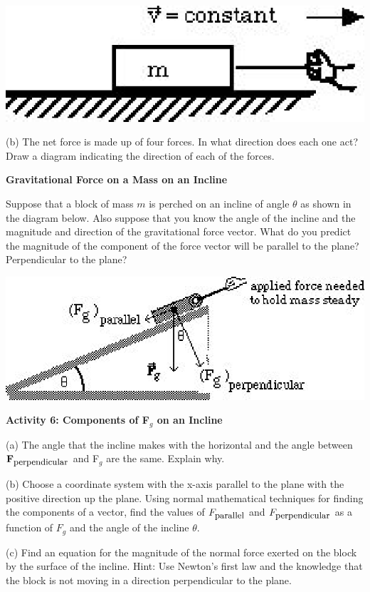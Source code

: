 \vspace{0.3cm}
{\par\raggedright \includegraphics{newton_fig9.eps} \par}
\vspace{0.3cm}

(b) The net force is made up of four forces.  
In what direction does each one act? Draw a
diagram indicating the direction of each of the forces.
\vspace{30mm}

\textbf{Gravitational Force on a Mass on an Incline }

Suppose that a block of mass $m$ is perched on an incline of angle \( \theta  \)
as shown in the diagram below. Also suppose that you know the angle of the incline
and the magnitude and direction of the gravitational force vector. What do you
predict the magnitude of the component of the force vector will be parallel
to the plane? Perpendicular to the plane?

\vspace{0.3cm}
{\par\centering \includegraphics{newton_fig10.eps} \par}
\vspace{0.3cm}

\textbf{Activity 6: Components of F\( _{g} \) on an Incline }

(a) The angle that the incline makes with the horizontal and the angle between
\( {\bf F}_{{\mbox{\small perpendicular}}} \) and F\( _{g} \) are the same. Explain why.
\vspace{20mm}

(b) Choose a coordinate system with the x-axis parallel to the plane with the
positive direction up the plane. Using normal mathematical techniques for finding the components of a vector, find the values of 
\( F_{\mbox{\small parallel}} \) and \( F_{\mbox{\small perpendicular}} \)
as a function of \( F_{g} \) and the angle of the incline \( \theta  \).
\vspace{20mm}

(c) Find an equation for the magnitude of the normal force exerted on the
block by the surface of the incline. Hint: Use Newton's first law and the knowledge that the block is not moving in a direction perpendicular to the plane.

